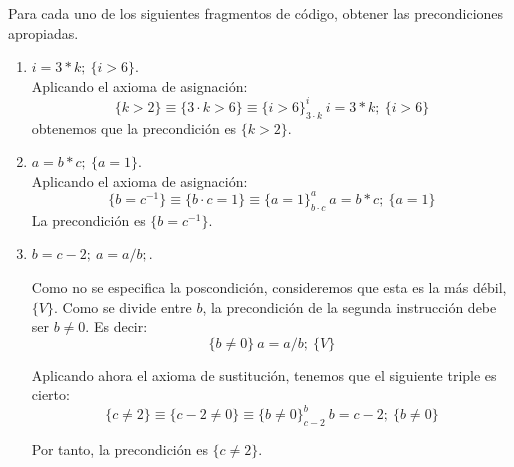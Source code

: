 \begin{ejercicio}
    Para cada uno de los siguientes fragmentos de código, obtener las precondiciones apropiadas.
    \begin{enumerate}
        \item $i=3\ast k;\ \{i>6\}$.\\
            Aplicando el axioma de asignación:
            \begin{equation*}
                \{k>2\} \equiv \{3\cdot k>6\} \equiv \{i>6\}^i_{3\cdot k}\ i=3\ast k;\ \{i>6\}
            \end{equation*}
            obtenemos que la precondición es $\{k>2\}$.
        \item $a=b\ast c;\ \{a=1\}$.\\
            Aplicando el axioma de asignación:
            \begin{equation*}
                \{b = c^{-1}\} \equiv \{b\cdot c = 1\} \equiv \{a=1\}^a_{b\cdot c}\ a=b\ast c;\ \{a=1\}
            \end{equation*}
        La precondición es $\{b=c^{-1}\}$.
        \item $b=c-2;\ a=a/b;$.
        
        Como no se especifica la poscondición, consideremos que esta es la más débil, $\{V\}$. Como se divide entre $b$, la precondición de la segunda instrucción debe ser $b\neq 0$. Es decir:
        \begin{equation*}
            \{b\neq 0\}\ a=a/b;\ \{V\}
        \end{equation*}

        Aplicando ahora el axioma de sustitución, tenemos que el siguiente triple es cierto:
        \begin{equation*}
            \{c\neq 2\}\equiv \{c-2\neq 0\} \equiv \{b\neq 0\}_{c-2}^b\ b=c-2;\ \{b\neq 0\}
        \end{equation*}

        Por tanto, la precondición es $\{c\neq 2\}$.
    \end{enumerate}
\end{ejercicio}

